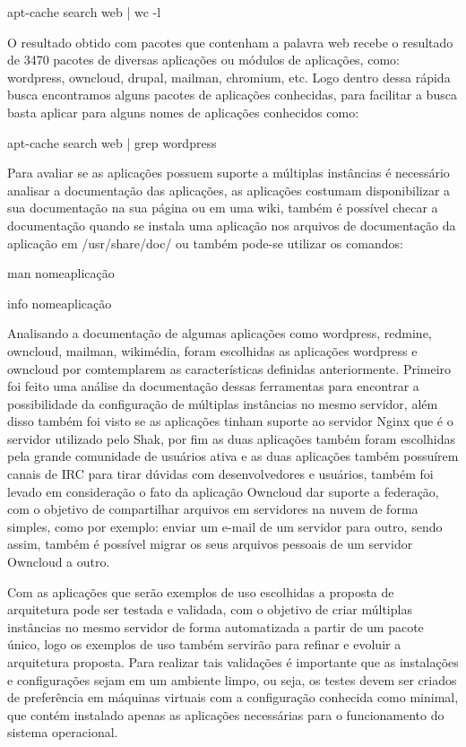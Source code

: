\begin{center}
apt-cache search web | wc -l
\end{center}

O resultado obtido com pacotes que contenham a palavra web recebe o resultado de 3470
pacotes de diversas aplicações ou módulos de aplicações, como:
wordpress, owncloud, drupal, mailman, chromium, etc. Logo dentro dessa rápida busca
encontramos alguns pacotes de aplicações conhecidas, para facilitar a busca basta
aplicar para alguns nomes de aplicações conhecidos como:

\begin{center}
apt-cache search web | grep wordpress
\end{center}

Para avaliar se as aplicações possuem suporte a múltiplas instâncias é necessário
analisar a documentação das aplicações, as aplicações costumam disponibilizar a sua
documentação na sua página ou em uma wiki, também é possível checar a documentação
quando se instala uma aplicação nos arquivos de documentação da aplicação em
/usr/share/doc/ ou também pode-se utilizar os comandos:

\begin{center}
man nomeaplicação

info nomeaplicação
\end{center}

Analisando a documentação de algumas aplicações como wordpress, redmine,
owncloud, mailman, wikimédia, foram escolhidas as aplicações wordpress e owncloud por
comtemplarem as características definidas anteriormente. Primeiro
foi feito uma análise da documentação dessas ferramentas para encontrar a
possibilidade da configuração de múltiplas instâncias no mesmo servidor, além
disso também foi visto se as aplicações tinham suporte ao servidor Nginx que é
o servidor utilizado pelo Shak, por fim as duas aplicações também foram escolhidas
pela grande comunidade de usuários ativa e as duas aplicações também possuírem
canais de IRC para tirar dúvidas com desenvolvedores e usuários, também foi levado
em consideração o fato da  aplicação Owncloud dar suporte a federação,
com  o objetivo de compartilhar arquivos em servidores na nuvem de forma simples,
como por exemplo: enviar um e-mail de um servidor para outro, sendo assim,
também é possível migrar os seus arquivos pessoais de um servidor Owncloud a outro.

Com as aplicações que serão exemplos de uso escolhidas a proposta de arquitetura
pode ser testada e validada, com o objetivo de criar múltiplas instâncias
no mesmo servidor de forma automatizada a partir de um pacote único, logo os
exemplos de uso também servirão para refinar e evoluir a arquitetura proposta.
Para realizar tais validações é importante que as instalações e configurações
sejam em um ambiente limpo, ou seja, os testes devem ser criados de preferência
em máquinas virtuais com a configuração conhecida como minimal, que contém
instalado apenas as aplicações necessárias para o funcionamento do sistema operacional.

